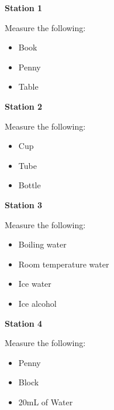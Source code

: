 \documentclass[54pt, fleqn, paper=letter, oneside]{scrartcl}
\begin{document}
\thispagestyle{empty}
\textbf{\LARGE Station 1}

Measure the following:
\begin{itemize}
\item Book
\item Penny
\item Table
\end{itemize}


\newpage
\thispagestyle{empty}

\textbf{\LARGE Station 2}

Measure the following:
\begin{itemize}
\item Cup
\item Tube
\item Bottle
\end{itemize}

\newpage
\thispagestyle{empty}

\textbf{\LARGE Station 3}

Measure the following:
\begin{itemize}
\item Boiling water
\item Room temperature water
\item Ice water
\item Ice alcohol
\end{itemize}

\newpage
\thispagestyle{empty}

\textbf{\LARGE Station 4}

Measure the following:
\begin{itemize}
\item Penny
\item Block
\item 20mL of Water
\end{itemize}
\end{document}
